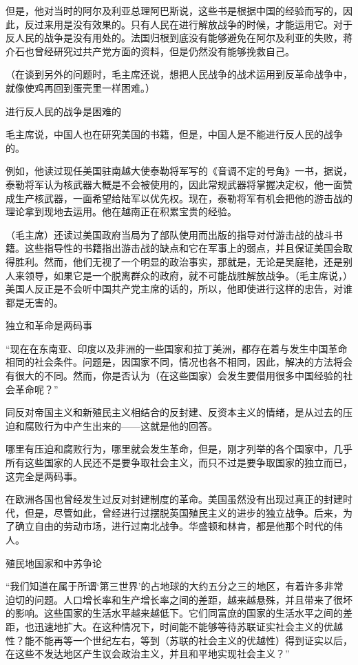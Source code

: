 但是，他对当时的阿尔及利亚总理阿巴斯说，这些书是根据中国的经验而写的，因此，反过来用是没有效果的。只有人民在进行解放战争的时候，才能运用它。对于反人民的战争是没有用处的。法国归根到底没有能够避免在阿尔及利亚的失败，蒋介石也曾经研究过共产党方面的资料，但是仍然没有能够挽救自己。

（在谈到另外的问题时，毛主席还说，想把人民战争的战术运用到反革命战争中，就像使鸡再回到蛋壳里一样困难。）

进行反人民的战争是困难的

毛主席说，中国人也在研究美国的书籍，但是，中国人是不能进行反人民的战争的。

例如，他读过现任美国驻南越大使泰勒将军写的《音调不定的号角》一书，据说，泰勒将军认为核武器大概是不会被使用的，因此常规武器将掌握决定权，他一面赞成生产核武器，一面希望给陆军以优先权。现在，泰勒将军有机会把他的游击战的理论拿到现地去运用。他在越南正在积累宝贵的经验。

（毛主席）还读过美国政府当局为了部队使用而出版的指导对付游击战的战斗书籍。这些指导性的书籍指出游击战的缺点和它在军事上的弱点，并且保证美国会取得胜利。然而，他们无视了一个明显的政治事实，那就是，无论是吴庭艳，还是别人来领导，如果它是一个脱离群众的政府，就不可能战胜解放战争。（毛主席说，）美国人反正是不会听中国共产党主席的话的，所以，他即使进行这样的忠告，对谁都是无害的。

独立和革命是两码事

“现在在东南亚、印度以及非洲的一些国家和拉丁美洲，都存在着与发生中国革命相同的社会条件。问题是，因国家不同，情况也各不相同，因此，解决的方法将会有很大的不同。然而，你是否认为（在这些国家）会发生要借用很多中国经验的社会革命呢？”

同反对帝国主义和新殖民主义相结合的反封建、反资本主义的情绪，是从过去的压迫和腐败行为中产生出来的——这就是他的回答。

哪里有压迫和腐败行为，哪里就会发生革命，但是，刚才列举的各个国家中，几乎所有这些国家的人民还不是要争取社会主义，而只不过是要争取国家的独立而已，这完全是两码事。

在欧洲各国也曾经发生过反对封建制度的革命。美国虽然没有出现过真正的封建时代，但是，尽管如此，曾经进行过摆脱英国殖民主义的进步的独立战争。后来，为了确立自由的劳动市场，进行过南北战争。华盛顿和林肯，都是他那个时代的伟人。

殖民地国家和中苏争论

“我们知道在属于所谓‘第三世界’的占地球的大约五分之三的地区，有着许多非常迫切的问题。人口增长率和生产增长率之间的差距，越来越悬殊，并且带来了很坏的影响。这些国家的生活水平越来越低下。它们同富庶的国家的生活水平之间的差距，也迅速地扩大。在这种情况下，时间能不能够等待苏联证实社会主义的优越性？能不能再等一个世纪左右，等到（苏联的社会主义的优越性）得到证实以后，在这些不发达地区产生议会政治主义，并且和平地实现社会主义？”

